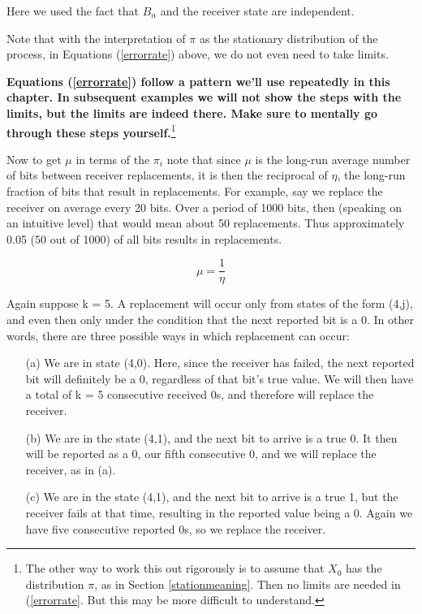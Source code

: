 Here we used the fact that $B_n$ and the receiver state are independent.

Note that with the interpretation of $\pi$ as the stationary
distribution of the process, in Equations (\ref{errorrate}) above, we
do not even need to take limits.

{\bf Equations (\ref{errorrate}) follow a pattern we'll use repeatedly
in this chapter.  In subsequent examples we will not show the steps with
the limits, but the limits are indeed there.  Make sure to mentally go
through these steps yourself.}\footnote{The other way to work this out
rigorously is to assume that $X_0$ has the distribution $\pi$,
as in Section \ref{stationmeaning}.  Then no limits are needed in
(\ref{errorrate}.  But this may be more difficult to understand.}

Now to get $\mu$ in terms of the $\pi_{i}$ note that since $\mu$ is the
long-run average number of bits between receiver replacements, it is
then the reciprocal of $\eta$, the long-run fraction of bits that result
in replacements. For example, say we replace the receiver on average
every 20 bits.
Over a period of 1000 bits, then (speaking on an intuitive level) that
would mean about 50 replacements.  Thus approximately 0.05 (50 out of
1000) of all bits results in replacements.

\begin{equation}
\mu = \frac{1}{\eta}
\end{equation}

Again suppose k = 5. A replacement will occur only from states of the
form (4,j), and even then only under the condition that the next
reported bit is a 0. In other words, there are three possible ways in
which replacement can occur:

\begin{itemize}

\item [(a)] We are in state (4,0). Here, since the receiver has failed,
the next reported bit will definitely be a 0, regardless of that bit's
true value. We will then have a total of k = 5 consecutive received 0s,
and therefore will replace the receiver. 

\item [(b)] We are in the state (4,1), and the next bit to arrive is a
true 0. It then will be reported as a 0, our fifth consecutive 0, and we
will replace the receiver, as in (a). 

\item [(c)] We are in the state (4,1), and the next bit to arrive is a
true 1, but the receiver fails at that time, resulting in the reported
value being a 0. Again we have five consecutive reported 0s, so we
replace the receiver. 

\end{itemize}

